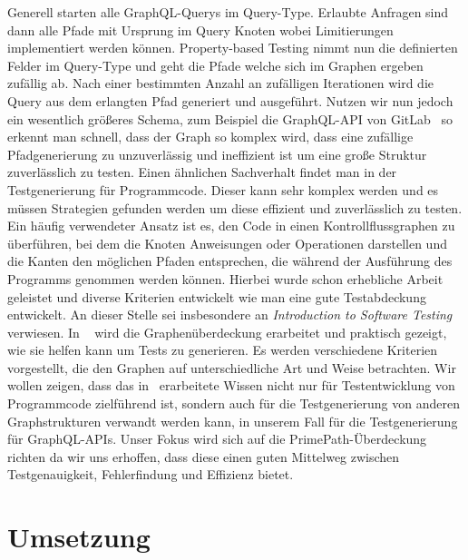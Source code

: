 Generell starten alle GraphQL-Querys im Query-Type.
Erlaubte Anfragen sind dann alle Pfade mit Ursprung im Query Knoten wobei Limitierungen implementiert werden können.
Property-based Testing nimmt nun die definierten Felder im Query-Type und geht die Pfade welche sich im Graphen ergeben zufällig ab.
Nach einer bestimmten Anzahl an zufälligen Iterationen wird die Query aus dem erlangten Pfad generiert und ausgeführt.
Nutzen wir nun jedoch ein wesentlich größeres Schema, zum Beispiel die GraphQL-API von GitLab~\cite{gitlab} so erkennt man schnell, dass
der Graph so komplex wird, dass eine zufällige Pfadgenerierung zu unzuverlässig und ineffizient ist um
eine große Struktur zuverlässlich zu testen.
Einen ähnlichen Sachverhalt findet man in der Testgenerierung für Programmcode.
Dieser kann sehr komplex werden und es müssen Strategien gefunden werden um diese effizient und zuverlässlich zu testen.
Ein häufig verwendeter Ansatz ist es, den Code in einen Kontrollflussgraphen zu überführen, bei dem die Knoten Anweisungen oder Operationen darstellen
und die Kanten den möglichen Pfaden entsprechen, die während der Ausführung des Programms genommen werden können.
Hierbei wurde schon erhebliche Arbeit geleistet und diverse Kriterien entwickelt wie man eine gute Testabdeckung entwickelt.
An dieser Stelle sei insbesondere an \textit{Introduction to Software Testing}\cite{software-testing} verwiesen.
In ~\cite{software-testing} wird die Graphenüberdeckung erarbeitet und praktisch gezeigt, wie sie helfen kann um Tests zu generieren.
Es werden verschiedene Kriterien vorgestellt, die den Graphen auf unterschiedliche Art und Weise betrachten.
Wir wollen zeigen, dass das in~\cite{software-testing} erarbeitete Wissen nicht nur für Testentwicklung von Programmcode zielführend ist,
sondern auch für die Testgenerierung von anderen Graphstrukturen verwandt werden kann, in unserem Fall für die Testgenerierung für GraphQL-APIs.
Unser Fokus wird sich auf die PrimePath-Überdeckung~\cite[vgl. Criterion 2.4]{software-testing} richten da wir uns erhoffen, dass diese einen guten Mittelweg zwischen
Testgenauigkeit, Fehlerfindung und Effizienz bietet.

\section{Umsetzung}

